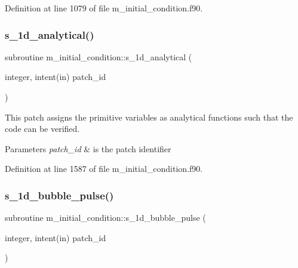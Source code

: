 Definition at line 1079 of file m\+\_\+initial\+\_\+condition.\+f90.

\mbox{\label{namespacem__initial__condition_a3b4fe978231e74b699695a35fb544236}} 
\subsubsection{\texorpdfstring{s\+\_\+1d\+\_\+analytical()}{s\_1d\_analytical()}}
{\footnotesize\ttfamily subroutine m\+\_\+initial\+\_\+condition\+::s\+\_\+1d\+\_\+analytical (\begin{DoxyParamCaption}\item[{integer, intent(in)}]{patch\+\_\+id }\end{DoxyParamCaption})}



This patch assigns the primitive variables as analytical functions such that the code can be verified. 


\begin{DoxyParams}{Parameters}
{\em patch\+\_\+id} & is the patch identifier \\
\hline
\end{DoxyParams}


Definition at line 1587 of file m\+\_\+initial\+\_\+condition.\+f90.

\mbox{\label{namespacem__initial__condition_a7685befab45f10089fc46907fa4cc049}} 
\subsubsection{\texorpdfstring{s\+\_\+1d\+\_\+bubble\+\_\+pulse()}{s\_1d\_bubble\_pulse()}}
{\footnotesize\ttfamily subroutine m\+\_\+initial\+\_\+condition\+::s\+\_\+1d\+\_\+bubble\+\_\+pulse (\begin{DoxyParamCaption}\item[{integer, intent(in)}]{patch\+\_\+id }\end{DoxyParamCaption})}




